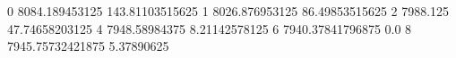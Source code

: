 0 8084.189453125 143.81103515625
1 8026.876953125 86.49853515625
2 7988.125 47.74658203125
4 7948.58984375 8.21142578125
6 7940.37841796875 0.0
8 7945.75732421875 5.37890625
